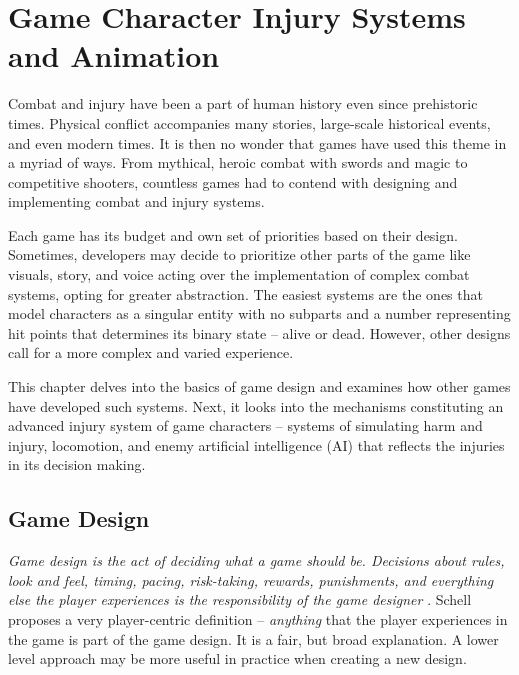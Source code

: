 
\chapter{Game Character Injury Systems and Animation}
\label{chap:theory}

Combat and injury have been a part of human history even since prehistoric times. Physical conflict accompanies many stories, large-scale historical events, and even modern times. It is then no wonder that games have used this theme in a myriad of ways. From mythical, heroic combat with swords and magic to competitive shooters, countless games had to contend with designing and implementing combat and injury systems.

Each game has its budget and own set of priorities based on their design. Sometimes, developers may decide to prioritize other parts of the game like visuals, story, and voice acting over the implementation of complex combat systems, opting for greater abstraction. The easiest systems are the ones that model characters as a singular entity with no subparts and a number representing hit points that determines its binary state -- alive or dead. However, other designs call for a more complex and varied experience.

This chapter delves into the basics of game design and examines how other games have developed such systems. Next, it looks into the mechanisms constituting an advanced injury system of game characters -- systems of simulating harm and injury, locomotion, and enemy artificial intelligence (AI) that reflects the injuries in its decision making.

\section{Game Design}
\label{sec:gamedesign}
\emph{Game design is the act of deciding what a game should be. Decisions about rules, look and feel, timing, pacing, risk-taking, rewards, punishments, and everything else the player experiences is the responsibility of the game designer} \cite{schell2019art}. Schell proposes a very player-centric definition -- \emph{anything} that the player experiences in the game is part of the game design. It is a fair, but broad explanation. A lower level approach may be more useful in practice when creating a new design.

